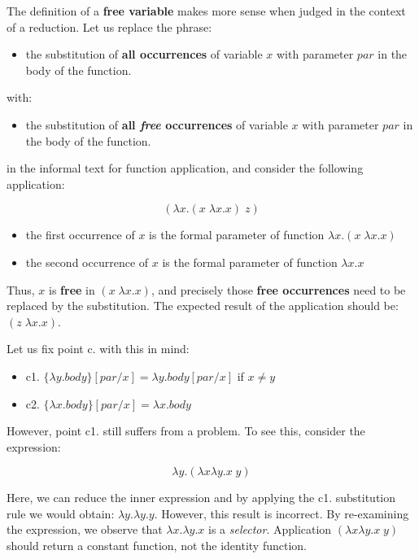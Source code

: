The definition of a \textbf{free variable} makes more sense when judged in the context of a reduction.
Let us replace the phrase:
\begin{itemize}
	\item  the substitution of \textbf{all occurrences} of variable $x$ with parameter $par$ in the body of the function.
\end{itemize}
with:
\begin{itemize}
	\item  the substitution of \textbf{all \textit{free} occurrences} of variable $x$ with parameter $par$ in the body of the function.
\end{itemize}
in the informal text for function application, and consider the following application:

$$ (\lambda x.(x\;\lambda x.x)\; z)$$

\begin{itemize}
	\item  the first occurrence of $x$ is the formal parameter of function $\lambda x.(x\;\lambda x.x)$
	\item  the second occurrence of $x$ is the formal parameter of function $\lambda x.x$
\end{itemize}

Thus, $x$ is \textbf{free} in $(x\;\lambda x.x)$, and precisely those \textbf{free occurrences} need to be replaced by the substitution. The expected result of the application should be: $(z\;\lambda x.x)$.

Let us fix point c. with this in mind:

\begin{itemize}
	\item  c1. $ \{\lambda y.body\}[par/x] = \lambda y.body[par/x]$ if $x \neq y$
	\item  c2. $ \{\lambda x.body\}[par/x] = \lambda x.body$
\end{itemize}

However, point c1. still suffers from a problem. To see this, consider the expression:

$$ \lambda y.(\lambda x \lambda y.x\;y) $$

Here, we can reduce the inner expression and by applying the c1. substitution rule we would obtain: $\lambda y.\lambda y.y$. However, this result is incorrect. By re-examining the expression, we observe that $\lambda x.\lambda y.x$ is a \textit{selector}. Application $(\lambda x \lambda y.x\;y)$ should return a constant function, not the identity function.

